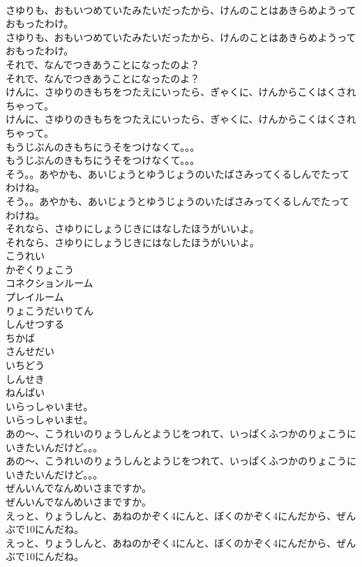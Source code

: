 \documentclass[8pt]{extreport}
\begin{document}
\begin{CJK}{UTF8}{min}
\\	さゆりも、おもいつめていたみたいだったから、けんのことはあきらめようっておもったわけ。
\\	さゆりも、おもいつめていたみたいだったから、けんのことはあきらめようっておもったわけ。
\\	それで、なんでつきあうことになったのよ？
\\	それで、なんでつきあうことになったのよ？
\\	けんに、さゆりのきもちをつたえにいったら、ぎゃくに、けんからこくはくされちゃって。
\\	けんに、さゆりのきもちをつたえにいったら、ぎゃくに、けんからこくはくされちゃって。
\\	もうじぶんのきもちにうそをつけなくて。。。
\\	もうじぶんのきもちにうそをつけなくて。。。
\\	そう。。あやかも、あいじょうとゆうじょうのいたばさみってくるしんでたってわけね。
\\	そう。。あやかも、あいじょうとゆうじょうのいたばさみってくるしんでたってわけね。
\\	それなら、さゆりにしょうじきにはなしたほうがいいよ。
\\	それなら、さゆりにしょうじきにはなしたほうがいいよ。
\\	こうれい
\\	かぞくりょこう
\\	コネクションルーム
\\	プレイルーム
\\	りょこうだいりてん
\\	しんせつする
\\	ちかば
\\	さんせだい
\\	いちどう
\\	しんせき
\\	ねんぱい
\\	いらっしゃいませ。　
\\	いらっしゃいませ。　
\\	あの～、こうれいのりょうしんとようじをつれて、いっぱくふつかのりょこうにいきたいんだけど。。。
\\	あの～、こうれいのりょうしんとようじをつれて、いっぱくふつかのりょこうにいきたいんだけど。。。
\\	ぜんいんでなんめいさまですか。
\\	ぜんいんでなんめいさまですか。
\\	えっと、りょうしんと、あねのかぞく4にんと、ぼくのかぞく4にんだから、ぜんぶで10にんだね。
\\	えっと、りょうしんと、あねのかぞく4にんと、ぼくのかぞく4にんだから、ぜんぶで10にんだね。

\end{CJK}
\end{document}
